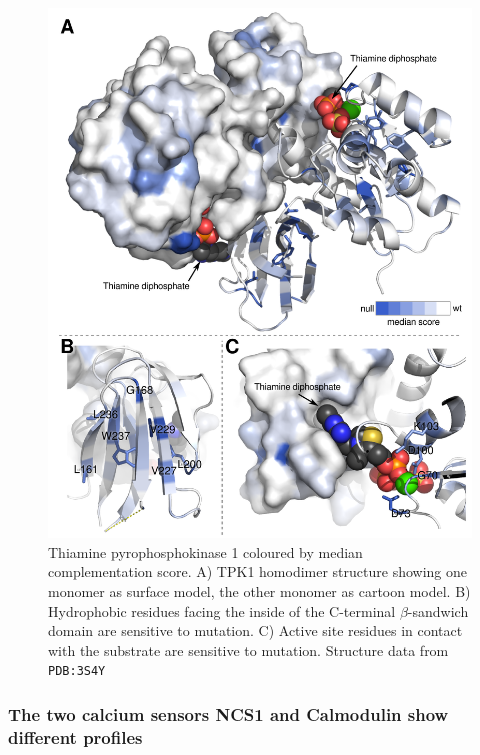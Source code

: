 \begin{figure}[h!]
	\centering
	\includegraphics[width=.8\textwidth]{img/tpk1_structure.pdf}
	\caption{Thiamine pyrophosphokinase 1 coloured by median complementation score. A) TPK1 homodimer structure showing one monomer as surface model, the other monomer as cartoon model. B) Hydrophobic residues facing the inside of the C-terminal $\beta$-sandwich domain are sensitive to mutation. C) Active site residues in contact with the substrate are sensitive to mutation. Structure data from \texttt{PDB:3S4Y}~\cite{timm_crystal_2001}}
	\label{fig:tpk1_structure}
\end{figure}


\subsubsection{The two calcium sensors NCS1 and Calmodulin show different profiles}


